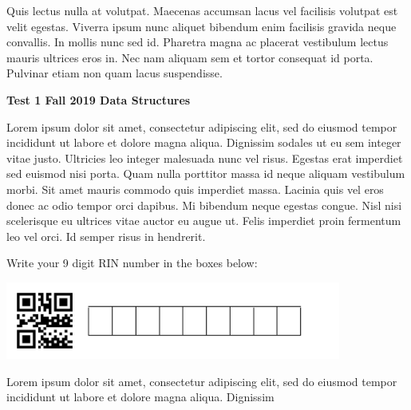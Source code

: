 \documentclass[12pt]{article}
\begin{document}
Quis lectus nulla at volutpat. Maecenas accumsan lacus vel facilisis volutpat est velit egestas. Viverra ipsum nunc aliquet bibendum enim facilisis gravida neque convallis. In mollis nunc sed id. Pharetra magna ac placerat vestibulum lectus mauris ultrices eros in. Nec nam aliquam sem et tortor consequat id porta. Pulvinar etiam non quam lacus suspendisse. 

\newpage

\noindent
{\Large \bf Test 1 \hfill Fall 2019 Data Structures}

\vspace{0.1in}

Lorem ipsum dolor sit amet, consectetur adipiscing elit, sed do eiusmod tempor incididunt ut labore et dolore magna aliqua. Dignissim sodales ut eu sem integer vitae justo. Ultricies leo integer malesuada nunc vel risus. Egestas erat imperdiet sed euismod nisi porta. Quam nulla porttitor massa id neque aliquam vestibulum morbi. Sit amet mauris commodo quis imperdiet massa. Lacinia quis vel eros donec ac odio tempor orci dapibus. Mi bibendum neque egestas congue. Nisl nisi scelerisque eu ultrices vitae auctor eu augue ut. Felis imperdiet proin fermentum leo vel orci. Id semper risus in hendrerit.

\vspace{0.1in}
\noindent
\begin{minipage}{4in}
Write your 9 digit RIN number in the boxes below:

\noindent
\includegraphics[height=1in,angle=-2.5]{blank_QR_numeric_id.png}
\end{minipage}
\hfill
\begin{minipage}{2.3in}
Lorem ipsum dolor sit amet, consectetur adipiscing elit, sed do
eiusmod tempor incididunt ut labore et dolore magna aliqua. Dignissim
\end{minipage}
\end{document}
